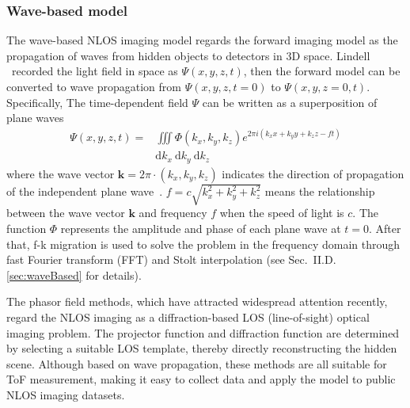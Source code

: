 \subsubsection{Wave-based model} \label{activeAlg}
The wave-based NLOS imaging model regards the forward imaging model as the propagation of waves from hidden objects to detectors in 3D space. Lindell \etal~recorded the light field in space as $\Psi(x,y,z,t)$, then the forward model can be converted to wave propagation from $\Psi(x,y,z,t= 0)$ to $\Psi(x,y,z=0,t)$. 
Specifically, The time-dependent field $\Psi$ can be written as a superposition of plane waves~\cite{Lindell:2019:Wave}
\begin{equation}
    \begin{split}
    \Psi(x, y, z, t)=  &\iiint \Phi\left(k_{x}, k_{y}, k_{z}\right) e^{2 \pi i\left(k_{x} x+k_{y} y+k_{z} z-f t\right)} \\
    & \mathrm{d} k_{x} \mathrm{~d} k_{y} \mathrm{~d} k_{z}
    \label{eqwave_3}
    \end{split}
\end{equation}
where the wave vector $\mathbf{k}=2 \pi \cdot\left(k_{x}, k_{y}, k_{z}\right)$ indicates the direction of propagation of the independent plane wave~\cite{Lindell:2019:Wave}. $f=c \sqrt{k_{x}^{2}+k_{y}^{2}+k_{z}^{2}}$ means the relationship between the wave vector $\mathbf{k}$ and frequency $f$ when the speed of light is $c$. The function $\Phi$ represents the amplitude and phase of each plane wave at $t = 0$. 
After that, f-k migration is used to solve the problem in the frequency domain through fast Fourier transform (FFT) and Stolt interpolation (see Sec.~II.D.\ref{sec:waveBased} for details).

The phasor field methods\cite{rezaPhasorFieldWaves2019,liuPhasorFieldDiffraction2020,liuVirtualWaveOptics2018}, which have attracted widespread attention recently, regard the NLOS imaging as a diffraction-based LOS (line-of-sight) optical imaging problem. The projector function and diffraction function are determined by selecting a suitable LOS template, thereby directly reconstructing the hidden scene. Although based on wave propagation, these methods are all suitable for ToF measurement, making it easy to collect data and apply the model to public NLOS imaging datasets.


